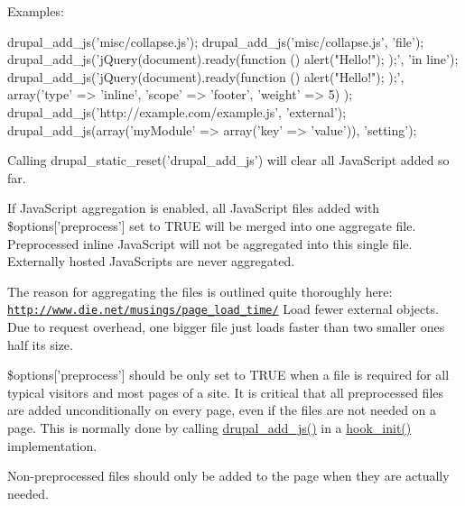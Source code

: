 Examples: 
\begin{DoxyCode}
   drupal_add_js('misc/collapse.js');
   drupal_add_js('misc/collapse.js', 'file');
   drupal_add_js('jQuery(document).ready(function () { alert("Hello!"); });', 'in
      line');
   drupal_add_js('jQuery(document).ready(function () { alert("Hello!"); });',
     array('type' => 'inline', 'scope' => 'footer', 'weight' => 5)
   );
   drupal_add_js('http://example.com/example.js', 'external');
   drupal_add_js(array('myModule' => array('key' => 'value')), 'setting');
\end{DoxyCode}


Calling drupal\_\-static\_\-reset('drupal\_\-add\_\-js') will clear all JavaScript added so far.

If JavaScript aggregation is enabled, all JavaScript files added with \$options\mbox{[}'preprocess'\mbox{]} set to TRUE will be merged into one aggregate file. Preprocessed inline JavaScript will not be aggregated into this single file. Externally hosted JavaScripts are never aggregated.

The reason for aggregating the files is outlined quite thoroughly here: \href{http://www.die.net/musings/page_load_time/}{\tt http://www.die.net/musings/page\_\-load\_\-time/} Load fewer external objects. Due to request overhead, one bigger file just loads faster than two smaller ones half its size.

\$options\mbox{[}'preprocess'\mbox{]} should be only set to TRUE when a file is required for all typical visitors and most pages of a site. It is critical that all preprocessed files are added unconditionally on every page, even if the files are not needed on a page. This is normally done by calling \hyperlink{common_8inc_a623370a2c3c2de0390dab078d17dca02}{drupal\_\-add\_\-js()} in a \hyperlink{group__hooks_ga74edef0c463436fdbb1f92ef367db051}{hook\_\-init()} implementation.

Non-\/preprocessed files should only be added to the page when they are actually needed.



